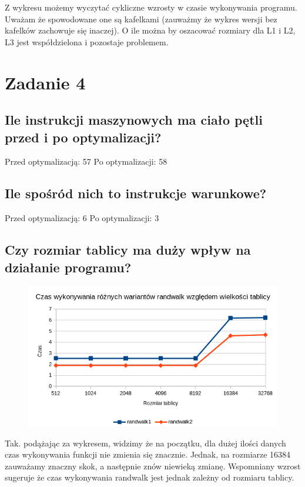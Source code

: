 \documentclass[a4paper,12pt]{mwart} %
\begin{document}
Z wykresu możemy wyczytać cykliczne wzrosty w czasie wykonywania programu. Uważam że spowodowane one są kafelkami (zauważmy że wykres wersji bez kafelków zachowuje się inaczej). O ile można by oszacować rozmiary dla L1 i L2, L3 jest współdzielona i pozostaje problemem.

\section*{Zadanie 4}


\subsection*{Ile instrukcji maszynowych ma ciało pętli przed i po optymalizacji?}

Przed optymalizacją: 57
Po optymalizacji: 58

\subsection*{Ile spośród nich to instrukcje warunkowe?}

Przed optymalizacją: 6
Po optymalizacji: 3

\subsection*{Czy rozmiar tablicy ma duży wpływ na działanie programu?}

\begin{figure}[h!]
  \includegraphics[width=\linewidth]{graphs/graph4.png}
\end{figure}


Tak. podążając za wykresem, widzimy że na początku, dla dużej ilości danych czas wykonywania funkcji nie zmienia się znacznie. Jednak, na rozmiarze 16384 zauważamy znaczny skok, a następnie znów niewieką zmianę. Wspomniany wzrost sugeruje że czas wykonywania randwalk jest jednak zależny od rozmiaru tablicy.
\end{document}
